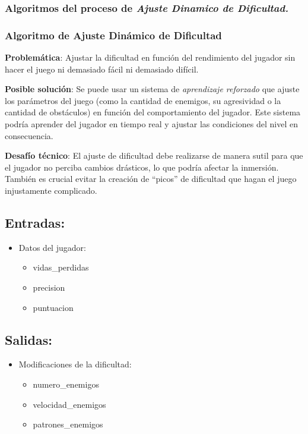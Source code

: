 \subsubsection{Algoritmos del proceso de \textit{Ajuste Dinamico de Dificultad.}}
\subsubsection*{Algoritmo de Ajuste Dinámico de Dificultad}

\textbf{Problemática}: Ajustar la dificultad en función del rendimiento del jugador sin hacer el juego ni demasiado fácil ni demasiado difícil.

\textbf{Posible solución}: Se puede usar un sistema de \textit{aprendizaje reforzado} que ajuste los parámetros del juego (como la cantidad de enemigos, su agresividad o la cantidad de obstáculos) en función del comportamiento del jugador. Este sistema podría aprender del jugador en tiempo real y ajustar las condiciones del nivel en consecuencia.

\textbf{Desafío técnico}: El ajuste de dificultad debe realizarse de manera sutil para que el jugador no perciba cambios drásticos, lo que podría afectar la inmersión. También es crucial evitar la creación de “picos” de dificultad que hagan el juego injustamente complicado.


\subsection*{Entradas:}
\begin{itemize}
    \item Datos del jugador:
    \begin{itemize}
        \item vidas\_perdidas
        \item precision
        \item puntuacion
    \end{itemize}
\end{itemize}

\subsection*{Salidas:}
\begin{itemize}
    \item Modificaciones de la dificultad:
    \begin{itemize}
        \item numero\_enemigos
        \item velocidad\_enemigos
        \item patrones\_enemigos
    \end{itemize}
\end{itemize}

